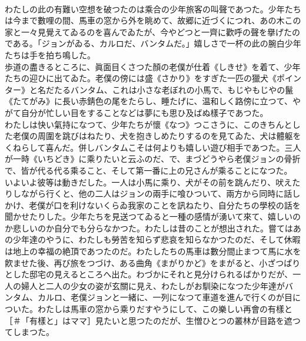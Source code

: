 \documentclass[8pt]{extreport}
\begin{document}
\begin{CJK}{UTF8}{min}
\\	わたしの此の有難い空想を破つたのは乘合の少年旅客の叫聲であつた。少年たちは今まで數哩の間、馬車の窓から外を眺めて、故郷に近づくにつれ、あの木この家と一々見覺えてゐるのを喜んでゐたが、今やどつと一齊に歡呼の聲を擧げたのである。「ジョンがゐる、カルロだ、バンタムだ。」嬉しさで一杯の此の腕白少年たちは手を拍ち鳴した。
\\	歩道の盡きるところに、眞面目くさつた顏の老僕が仕着《しきせ》を着て、少年たちの迎ひに出てゐた。老僕の傍には盛《さかり》をすぎた一匹の獵犬《ポインター》と名だたるバンタム、これは小さな老ぼれの小馬で、もじやもじやの鬣《たてがみ》に長い赤錆色の尾をたらし、睡たげに、温和しく路傍に立つて、やがて自分が忙しい目をすることなどは夢にも思ひ及ばぬ樣子であつた。
\\	わたしは快い氣持になつて、少年たちが懷《なつ》つこさうに、このきちんとした老僕の周圍を跳びはねたり、犬を抱きしめたりするのを見てゐた、犬は體躯をくねらして喜んだ。併しバンタムこそは何よりも嬉しい遊び相手であつた。三人が一時《いちどき》に乘りたいと云ふのだ、で、まづどうやら老僕ジョンの骨折で、皆が代る代る乘ること、そして第一番に上の兄さんが乘ることになつた。
\\	いよいよ彼等は動きだした。一人は小馬に乘り、犬がその前を跳んだり、吠えたりしながら行くと、他の二人はジョンの兩手に喰ひついて、兩方から同時に話しかけ、老僕が口を利けないくらゐ我家のことを訊ねたり、自分たちの學校の話を聞かせたりした。少年たちを見送つてゐると一種の感情が湧いて來て、嬉しいのか悲しいのか自分でも分らなかつた。わたしは昔のことが想出された。嘗てはあの少年達のやうに、わたしも勞苦を知らず悲哀を知らなかつたのだ、そして休暇は地上の幸福の絶頂であつたのだ。わたしたちの馬車は數分間止まつて馬に水を飮ませた後、再び旅をつづけ、ある曲角《まがりかど》をまがると、小ざつぱりとした邸宅の見えるところへ出た。わづかにそれと見分けられるばかりだが、一人の婦人と二人の少女の姿が玄關に見え、わたしがお馴染になつた少年達がバンタム、カルロ、老僕ジョンと一緒に、一列になつて車道を進んで行くのが目についた。わたしは馬車の窓から乘りだすやうにして、この樂しい再會の有樣と［＃「有樣と」はママ］見たいと思つたのだが、生憎ひとつの叢林が目路を遮つてしまつた。

\end{CJK}
\end{document}

